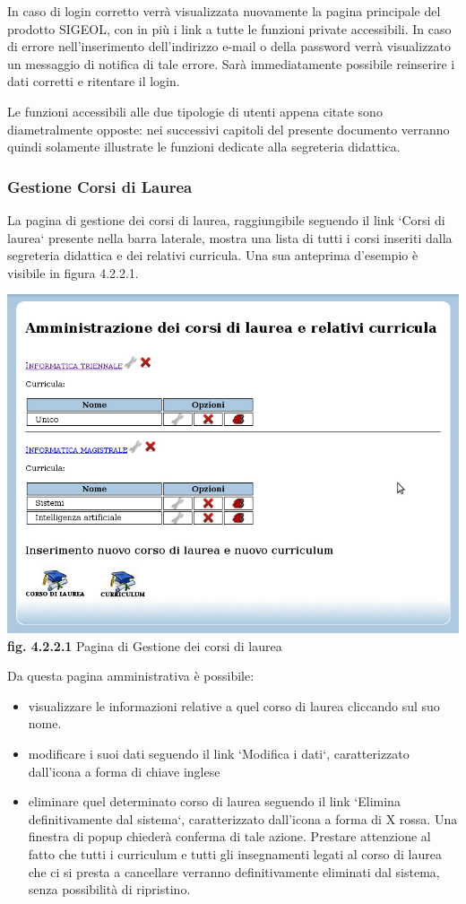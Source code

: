 \documentclass[11pt,a4paper]{article}
\begin{document}
In caso di login corretto verrà visualizzata nuovamente la pagina principale del prodotto SIGEOL, con in più i link a tutte le funzioni private accessibili.
In caso di errore nell'inserimento dell'indirizzo e-mail o della password verrà visualizzato un messaggio di notifica di tale errore.
Sarà immediatamente possibile reinserire i dati corretti e ritentare il login.

Le funzioni accessibili alle due tipologie di utenti appena citate sono diametralmente opposte: nei successivi capitoli del presente documento verranno quindi solamente illustrate le funzioni dedicate alla segreteria didattica.
\subsubsection{Gestione Corsi di Laurea}
La pagina di gestione dei corsi di laurea, raggiungibile seguendo il link `Corsi di laurea` presente nella barra laterale, mostra una lista di tutti i corsi inseriti dalla segreteria didattica e dei relativi curricula. Una sua anteprima d'esempio è visibile in figura 4.2.2.1.
\bigskip
\begin{center}
	\includegraphics[scale=0.5]{images/corsi_di_laurea.jpg}\\
	\textbf{fig. 4.2.2.1} Pagina di Gestione dei corsi di laurea\\
\end{center}
\bigskip

Da questa pagina amministrativa è possibile:
\begin{itemize}
 \item visualizzare le informazioni relative a quel corso di laurea cliccando sul suo nome.
 \item modificare i suoi dati seguendo il link `Modifica i dati`, caratterizzato dall'icona a forma di chiave inglese
 \item eliminare quel determinato corso di laurea seguendo il link `Elimina definitivamente dal sistema`, caratterizzato dall'icona a forma di X rossa. Una finestra di popup chiederà conferma di tale azione. Prestare attenzione al fatto che tutti i curriculum e tutti gli insegnamenti legati al corso di laurea che ci si presta a cancellare verranno definitivamente eliminati dal sistema, senza possibilità di ripristino.
\end{itemize}
\end{document}
